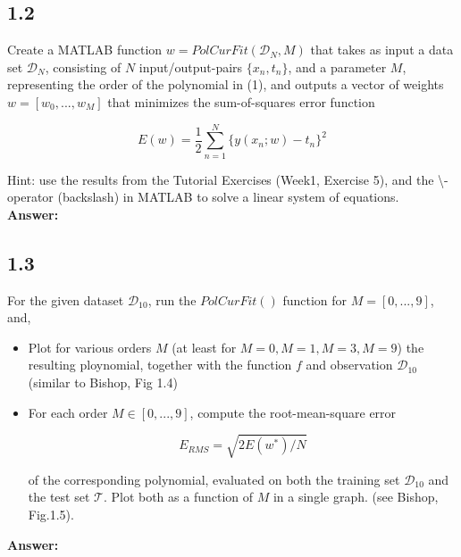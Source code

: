 \documentclass[a4paper]{article}
\begin{document}
\subsection*{1.2}

Create a MATLAB function $w = PolCurFit(\mathcal{D}_N,M)$ that takes as input a data set $\mathcal{D}_N$, consisting of $N$ input/output-pairs $\{ x_n, t_n\}$, and a parameter $M$, representing the order of the polynomial in (1), and outputs a vector of weights $w = [w_0, ...,w_M]$ that minimizes the sum-of-squares error function

\begin{equation}
	E(w) = \frac{1}{2} \sum_{n=1}^N \{ y(x_n;w) - t_n\}^2
\end{equation}

Hint: use the results from the Tutorial Exercises (Week1, Exercise 5), and the \textbackslash-operator (backslash) in MATLAB to solve a linear system of equations.\\

\textbf{Answer:}\\

\subsection*{1.3}

For the given dataset $\mathcal{D}_{10}$, run the $PolCurFit()$ function for $M = [0,...,9]$, and,

\begin{itemize}
	\item Plot for various orders $M$ (at least for $M = 0, M = 1, M = 3, M = 9$) the resulting ploynomial, together with the function $f$ and observation $\mathcal{D}_{10}$ (similar to Bishop, Fig 1.4)
	\item For each order $M \in [0,...,9]$, compute the root-mean-square error
	
	\begin{equation}
		E_{RMS} = \sqrt{2E(w^*)/N}
	\end{equation}
	
	of the corresponding polynomial, evaluated on both the training set $\mathcal{D}_{10}$ and the test set $\mathcal{T}$. Plot both as a function of $M$ in a single graph. (see Bishop, Fig.1.5).\\
\end{itemize}

\textbf{Answer:}\\
\end{document}
